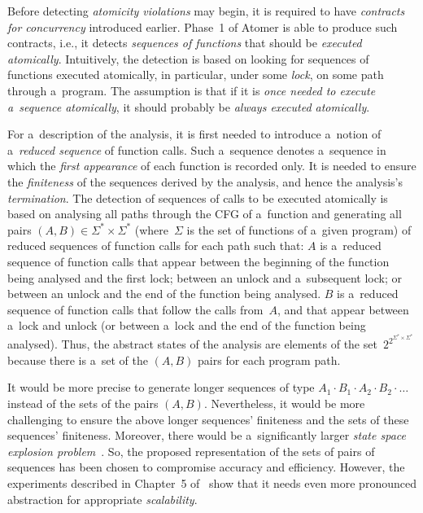 Before detecting \emph{atomicity violations} may begin, it is required to have \emph{contracts for concurrency} introduced earlier. Phase~1 of Atomer is able to produce such contracts, i.e., it detects \emph{sequences of functions} that should be \emph{executed atomically}. Intuitively, the detection is based on looking for sequences of functions executed atomically, in particular, under some \emph{lock}, on some path through a~program. The assumption is that if it is \emph{once needed to execute a~sequence atomically}, it should probably be \emph{always executed atomically}.

For a~description of the analysis, it is first needed to introduce a~notion of a~\emph{reduced sequence} of function calls. Such a~sequence denotes a~sequence in which the \emph{first appearance} of each function is recorded only. It is needed to ensure the \emph{finiteness} of the sequences derived by the analysis, and hence the analysis's \emph{termination}. The detection of sequences of calls to be executed atomically is based on analysing all paths through the CFG of a~function and generating all pairs $ (A, B) \in \Sigma^* \times \Sigma^* $ (where~$ \Sigma $ is the set of functions of a~given program) of reduced sequences of function calls for each path such that: $ A $ is a~reduced sequence of function calls that appear between the beginning of the function being analysed and the first lock; between an unlock and a~subsequent lock; or between an unlock and the end of the function being analysed. $ B $ is a~reduced sequence of function calls that follow the calls from~$ A $, and that appear between a~lock and unlock (or between a~lock and the end of the function being analysed). Thus, the abstract states of the analysis are elements of the set~$ 2^{2^{\Sigma^* \times \Sigma^*}} $ because there is a~set of the $ (A, B) $ pairs for each program path.

It would be more precise to generate longer sequences of type $ A_1 \cdot B_1 \cdot A_2 \cdot B_2 \cdot \ldots\ $ instead of the sets of the pairs $ (A, B) $. Nevertheless, it would be more challenging to ensure the above longer sequences' finiteness and the sets of these sequences' finiteness. Moreover, there would be a~significantly larger \emph{state space explosion problem}~\cite{stateExpl}. So, the proposed representation of the sets of pairs of sequences has been chosen to compromise accuracy and efficiency. However, the experiments described in Chapter~5 of~\cite{harmimBP} show that it needs even more pronounced abstraction for appropriate \emph{scalability}.

